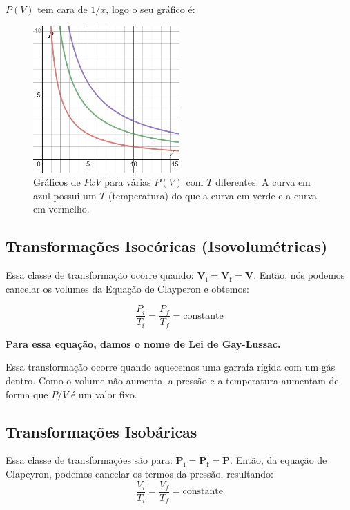 \documentclass[12pt]{extarticle}
\newcommand{\<}{\langle}
\renewcommand{\>}{\rangle}
\theoremstyle{definition}
\begin{document}
$P(V)$ tem cara de $1/x$, logo o seu gráfico é:

\begin{figure}[H]
    \centering
    \includegraphics[width=0.5\textwidth]{isotermas.png}
    \caption{Gráficos de $PxV$ para várias $P(V)$ com $T$ diferentes. A curva em azul possui um $T$ (temperatura) do que a curva em verde e a curva em vermelho.}
    \label{fig:isoterma}
\end{figure}

\subsection{Transformações Isocóricas (Isovolumétricas)}

Essa classe de transformação ocorre quando: $\mathbf{V_i = V_f = V}$. Então, nós podemos cancelar os volumes da Equação de Clayperon e obtemos:

\begin{equation}
    \frac{P_i}{T_i} = \frac{P_f}{T_f} = \text{constante}
\end{equation}

\textbf{Para essa equação, damos o nome de Lei de Gay-Lussac.}

Essa transformação ocorre quando aquecemos uma garrafa rígida com um gás dentro. Como o volume não aumenta, a pressão e a temperatura aumentam de forma que $P/V$ é um valor fixo.

\subsection{Transformações Isobáricas}

Essa classe de transformações são para: $\mathbf{P_i = P_f = P}$. Então, da equação de Clapeyron, podemos cancelar os termos da pressão, resultando:
\begin{equation}
    \frac{V_i}{T_i} = \frac{V_f}{T_f} = \text{constante}
\end{equation}
\end{document}
